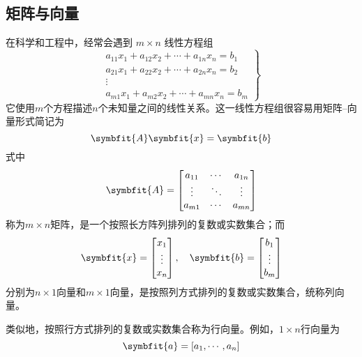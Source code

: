 \documentclass[punct=kaiming, fontset=sikou]{ctexbook}
\numberwithin{equation}{section}
\def\bf#1{\symbfit{#1}}
\begin{document}
  \subsection{矩阵与向量}
  在科学和工程中，经常会遇到 $m \times n$ 线性方程组
  \begin{equation}
    \left.
    \begin{array}{c}
      a_{11} x_1 + a_{12} x_2 + \cdots + a_{1n} x_n = b_1\\
      a_{21} x_1 + a_{22} x_2 + \cdots + a_{2n} x_n = b_2\\
      \vdots\\
      a_{m1} x_1 + a_{m2} x_2 + \cdots + a_{mn} x_n = b_m
    \end{array}
    \right\}
  \end{equation}
  它使用$m$个方程描述$n$个未知量之间的线性关系。这一线性方程组很容易用矩阵--向量形式简记为
  \begin{equation}
    \bf{A} \bf{x} = \bf{b}
  \end{equation}
  式中
  \begin{equation}
    \bf{A} = \begin{bmatrix}
      a_{11} & \cdots & a_{1n} \\
      \vdots & \ddots & \vdots \\
      a_{m1} & \cdots & a_{mn}
    \end{bmatrix}
  \end{equation}
  称为$m\times n$矩阵，是一个按照长方阵列排列的复数或实数集合；而
  \begin{equation}
    \bf{x} = \begin{bmatrix}
      x_1 \\ \vdots \\ x_n
    \end{bmatrix}, \quad
    \bf{b} = \begin{bmatrix}
      b_1 \\ \vdots \\ b_m
    \end{bmatrix}
  \end{equation}
  分别为$n\times 1$向量和$m\times 1$向量，是按照列方式排列的复数或实数集合，统称列向量。

  类似地，按照行方式排列的复数或实数集合称为行向量。例如，$1\times n$行向量为
  \begin{equation}
    \bf{a} = [a_1,\cdots,a_n]
  \end{equation}
\end{document}
